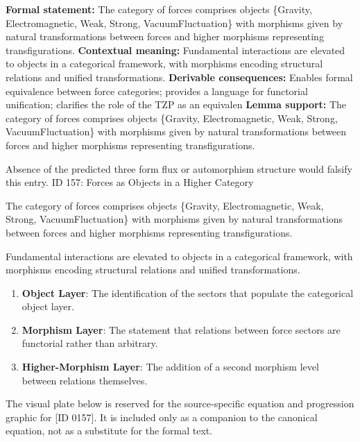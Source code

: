 \begingroup\footnotesize\setlength{\emergencystretch}{3em}\sloppy
\textbf{Formal statement:} The category of forces comprises objects \{Gravity, Electromagnetic, Weak, Strong, VacuumFluctuation\} with morphisms given by natural transformations between forces and higher morphisms representing transfigurations.  
\textbf{Contextual meaning:} Fundamental interactions are elevated to objects in a categorical framework, with morphisms encoding structural relations and unified transformations.  
\textbf{Derivable consequences:} Enables formal equivalence between force categories; provides a language for functorial unification; clarifies the role of the TZP as an equivalen
\textbf{Lemma support:} The category of forces comprises objects \{Gravity, Electromagnetic, Weak, Strong, VacuumFluctuation\} with morphisms given by natural transformations between forces and higher morphisms representing transfigurations.  \par
\endgroup

Absence of the predicted three form flux or automorphism structure would falsify this entry. ID 157: Forces as Objects in a Higher Category

The category of forces comprises objects \{Gravity, Electromagnetic, Weak, Strong, VacuumFluctuation\} with morphisms given by natural transformations between forces and higher morphisms representing transfigurations.  

Fundamental interactions are elevated to objects in a categorical framework, with morphisms encoding structural relations and unified transformations.  
\endgroup

\begin{enumerate}[leftmargin=1.6em,itemsep=6pt,topsep=4pt]
\item \textbf{Object Layer}: The identification of the sectors that populate the categorical object layer.
\item \textbf{Morphism Layer}: The statement that relations between force sectors are functorial rather than arbitrary.
\item \textbf{Higher-Morphism Layer}: The addition of a second morphism level between relations themselves.
\end{enumerate}

\begingroup\footnotesize\sloppy
The visual plate below is reserved for the source-specific equation and progression graphic for [ID 0157]. It is included only as a companion to the canonical equation, not as a substitute for the formal text.
\par\endgroup
\ifTZPDarkEdition
{}
\fi

